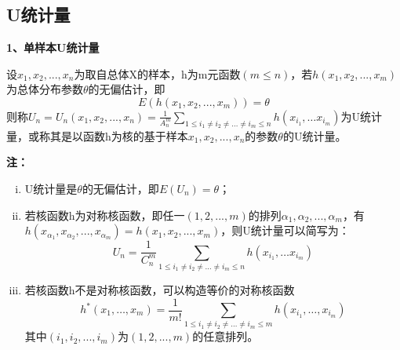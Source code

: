 \documentclass[lang=cn,10pt]{elegantbook}
\begin{document}
\subsection{U统计量}
\textbf{1、单样本U统计量}
\begin{definition}
    设$x_1,x_2,...,x_n$为取自总体X的样本，h为m元函数$(m\leq n)$，若$h(x_1,x_2,...,x_m)$为总体分布参数$\theta$的无偏估计，即
    \begin{equation}
        E(h(x_1,x_2,...,x_m))=\theta
    \end{equation}
    则称$U_n = U_n(x_1,x_2,...,x_n) = \frac1{A_n^m}\sum_{1\leq i_1\neq i_2\neq\ldots\neq i_m\leq n}h(x_{i_1},\ldots x_{i_m})$为U统计量，或称其是以函数h为核的基于样本$x_1,x_2,...,x_n$的参数$\theta$的U统计量。
\end{definition}
\textbf{注：}
\begin{enumerate}[(i)]
    \item U统计量是$\theta$的无偏估计，即$E(U_n) = \theta$；
    \item 若核函数h为对称核函数，即任一$(1,2,...,m)$的排列$\alpha_{1},\alpha_{2},...,\alpha_{m}$，有
          $h(x_{\alpha_1},x_{\alpha_2},...,x_{\alpha_m})=h(x_1,x_2,...,x_m)$，则U统计量可以简写为：
          \begin{equation}
              U_n = \frac1{C_n^m}\sum_{1\leq i_1\neq i_2\neq\ldots\neq i_m\leq n}h(x_{i_1},\ldots x_{i_m})
          \end{equation}
    \item 若核函数h不是对称核函数，可以构造等价的对称核函数
          \begin{equation}
              h^*(x_1,\ldots,x_m)=\frac1{m!}\sum_{1\leq i_1\neq i_2\neq\ldots\neq i_m\leq m}h(x_{i_1},\ldots,x_{i_m})
          \end{equation}
          其中$(i_1,i_2,...,i_m)$为$(1,2,...,m)$的任意排列。
\end{enumerate}
\end{document}

